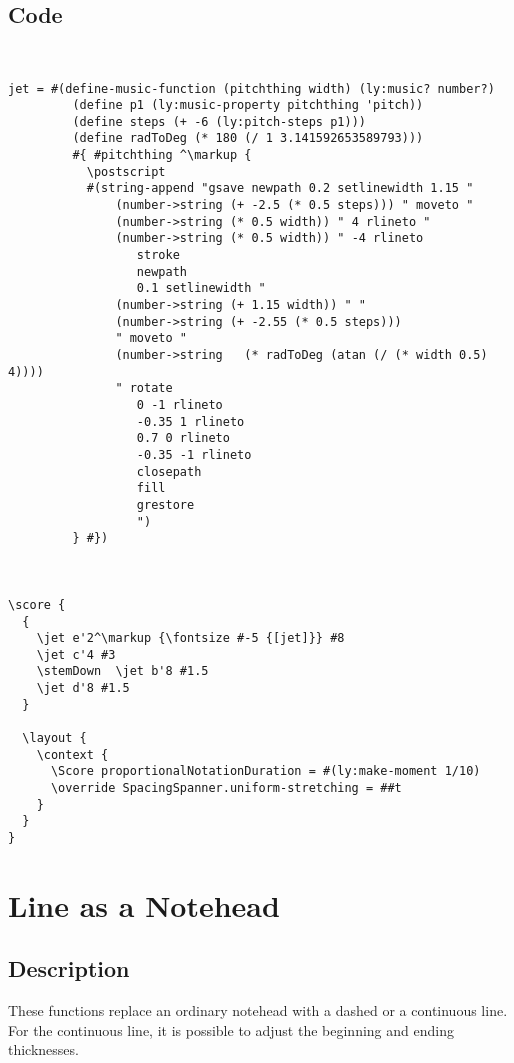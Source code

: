 \documentclass[11pt, oneside]{book}   	%
\begin{document}
\subsection{Code}
\begin{verbatim}


jet = #(define-music-function (pitchthing width) (ly:music? number?)
         (define p1 (ly:music-property pitchthing 'pitch))
         (define steps (+ -6 (ly:pitch-steps p1)))
         (define radToDeg (* 180 (/ 1 3.141592653589793)))
         #{ #pitchthing ^\markup {
           \postscript 
           #(string-append "gsave newpath 0.2 setlinewidth 1.15 "
               (number->string (+ -2.5 (* 0.5 steps))) " moveto "
               (number->string (* 0.5 width)) " 4 rlineto "
               (number->string (* 0.5 width)) " -4 rlineto
                  stroke
                  newpath
                  0.1 setlinewidth "
               (number->string (+ 1.15 width)) " "
               (number->string (+ -2.55 (* 0.5 steps)))
               " moveto "
               (number->string   (* radToDeg (atan (/ (* width 0.5) 4))))
               " rotate
                  0 -1 rlineto
                  -0.35 1 rlineto
                  0.7 0 rlineto
                  -0.35 -1 rlineto
                  closepath
                  fill
                  grestore
                  ")
         } #})



\score {
  {
    \jet e'2^\markup {\fontsize #-5 {[jet]}} #8
    \jet c'4 #3
    \stemDown  \jet b'8 #1.5
    \jet d'8 #1.5
  }

  \layout {
    \context {
      \Score proportionalNotationDuration = #(ly:make-moment 1/10)
      \override SpacingSpanner.uniform-stretching = ##t
    }
  }
}
\end{verbatim}
\vfill \break




\section {Line as a Notehead}
\hfill

\subsection{Description}
These functions replace an ordinary notehead with a dashed or a continuous line. For the continuous line, it is possible to adjust the beginning and ending thicknesses.
\end{document}
